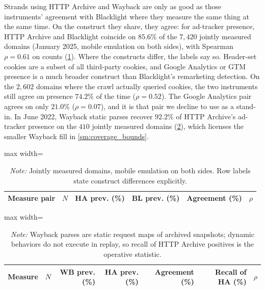 \documentclass[12pt, letterpaper]{article}
\begin{document}
Strands using HTTP Archive and Wayback are only as good as those instruments' agreement with Blacklight where they measure the same thing at the same time. On the construct they share, they agree: for ad-tracker presence, HTTP Archive and Blacklight coincide on $85.6\%$ of the $7{,}420$ jointly measured domains (January 2025, mobile emulation on both sides), with Spearman $\rho = 0.61$ on counts (\cref{tab:ha_bl_agreement}).
Where the constructs differ, the labels say so. Header-set cookies are a subset of all third-party cookies, and Google Analytics or GTM presence is a much broader construct than Blacklight's remarketing detection. On the $2{,}602$ domains where the crawl actually queried cookies, the two instruments still agree on presence $74.2\%$ of the time ($\rho = 0.52$). The Google Analytics pair agrees on only $21.0\%$ ($\rho = 0.07$), and it is that pair we decline to use as a stand-in. In June 2022, Wayback static parses recover $92.2\%$ of HTTP Archive's ad-tracker presence on the $410$ jointly measured domains (\cref{tab:wb_ha_agreement}), which licenses the smaller Wayback fill in \cref{sm:coverage_bounds}.
 

\begin{table}[ht]
\centering
\caption{HTTP Archive versus Blacklight, contemporaneous agreement (January 2025)}
\label{tab:ha_bl_agreement}
\begin{adjustbox}{max width=\textwidth}
\begin{tabular}{lrrrrr}
\toprule
Measure pair & $N$ & HA prev. (\%) & BL prev. (\%) & Agreement (\%) & $\rho$ \\
\midrule

\bottomrule
\end{tabular}
\end{adjustbox}
\caption*{\textit{Note:} Jointly measured domains, mobile emulation on both sides. Row labels state construct differences explicitly.}
\end{table}

\begin{table}[ht]
\centering
\caption{Wayback versus HTTP Archive, contemporaneous agreement (June 2022)}
\label{tab:wb_ha_agreement}
\begin{adjustbox}{max width=\textwidth}
\begin{tabular}{lrrrrrr}
\toprule
Measure & $N$ & WB prev. (\%) & HA prev. (\%) & Agreement (\%) & Recall of HA (\%) & $\rho$ \\
\midrule

\bottomrule
\end{tabular}
\end{adjustbox}
\caption*{\textit{Note:} Wayback parses are static request maps of archived snapshots; dynamic behaviors do not execute in replay, so recall of HTTP Archive positives is the operative statistic.}
\end{table}
\end{document}
